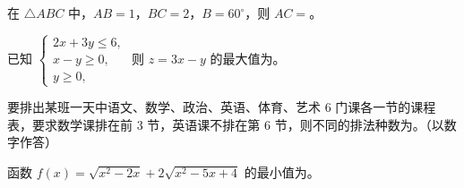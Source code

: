 \begin{question}
在 $\triangle ABC$ 中，$AB=1$，$BC=2$，$B=60^\circ$，则 $AC=$\gkblank{}。

\end{question}
\begin{question}
已知 $\begin{cases}2x+3y\leqslant6,\\ x-y\geqslant0,\\ y\geqslant0,\end{cases}$ 则 $z=3x-y$ 的最大值为\gkblank{}。

\end{question}
\begin{question}
要排出某班一天中语文、数学、政治、英语、体育、艺术 $6$ 门课各一节的课程表，要求数学课排在前 $3$ 节，英语课不排在第 $6$ 节，则不同的排法种数为\gkblank{}。（以数字作答）

\end{question}
\begin{question}
函数 $f(x)=\sqrt{x^2-2x}+2\sqrt{x^2-5x+4}$ 的最小值为\gkblank{}。

\end{question}

